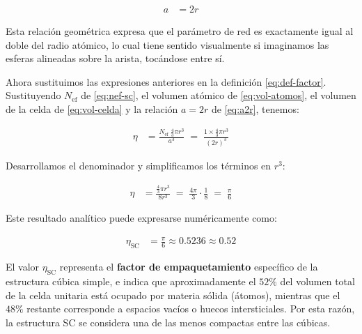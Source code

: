 \documentclass{article}
\begin{document}
\begin{equation}
\begin{split}
a &= 2r
\end{split} \label{eq:a2r}
\end{equation}

Esta relación geométrica expresa que el parámetro de red es exactamente igual al doble del radio atómico, lo cual tiene sentido visualmente si imaginamos las esferas alineadas sobre la arista, tocándose entre sí.

Ahora sustituimos las expresiones anteriores en la definición \eqref{eq:def-factor}.  
Sustituyendo \(N_{\text{ef}}\) de \eqref{eq:nef-sc}, el volumen atómico de \eqref{eq:vol-atomos}, el volumen de la celda de \eqref{eq:vol-celda} y la relación \(a=2r\) de \eqref{eq:a2r}, tenemos:

\begin{equation}
\begin{split}
\eta &= \frac{N_{\text{ef}}\;\frac{4}{3}\pi r^{3}}{a^{3}}
     \;=\; \frac{1\times \frac{4}{3}\pi r^{3}}{(2r)^{3}}
\end{split} \label{eq:eta-paso1}
\end{equation}

Desarrollamos el denominador y simplificamos los términos en \(r^{3}\):

\begin{equation}
\begin{split}
\eta &= \frac{\frac{4}{3}\pi r^{3}}{8r^{3}}
     \;=\; \frac{4\pi}{3}\cdot\frac{1}{8}
     \;=\; \frac{\pi}{6}
\end{split} \label{eq:eta-paso2}
\end{equation}

Este resultado analítico puede expresarse numéricamente como:

\begin{equation}
\begin{split}
\eta_{\text{SC}} &= \frac{\pi}{6} \approx 0.5236 \approx \boxed{0.52}
\end{split} \label{eq:eta-sc-num}
\end{equation}

El valor \(\eta_{\text{SC}}\) representa el \textcolor{Cerulean}{\textbf{factor de empaquetamiento}} específico de la estructura cúbica simple, e indica que aproximadamente el \(52\%\) del volumen total de la celda unitaria está ocupado por materia sólida (átomos), mientras que el \(48\%\) restante corresponde a espacios vacíos o huecos intersticiales.  
Por esta razón, la estructura SC se considera una de las menos compactas entre las cúbicas.
\end{document}
